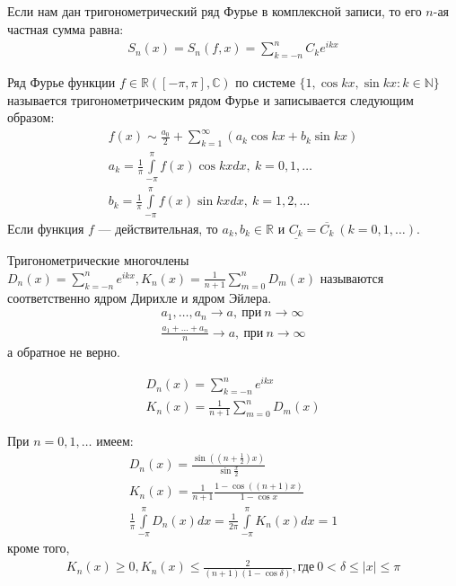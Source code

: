 \begin{definition}
  Если нам дан тригонометрический ряд Фурье в комплексной записи, то его
  $n$-ая частная сумма равна:
  \begin{gather}
    S_n(x) = S_n(f, x) = \sum\limits_{k = -n}^{n} C_k e^{ikx}
    \label{def441:eq1}
  \end{gather}
\end{definition}

\begin{definition}
  Ряд Фурье функции $f \in \mathbb{R}([-\pi, \pi], \mathbb{C})$ по системе
  $\{1, \cos kx, \sin kx: k \in \mathbb{N}\}$ называется тригонометрическим
  рядом Фурье и записывается следующим образом:
  \begin{gather}
    f(x) \sim \frac{a_0}{2} + \sum\limits_{k = 1}^{\infty} (a_k \cos kx + b_k
    \sin kx)
    \label{def442:sim1} \\
    a_k = \frac{1}{\pi} \int\limits_{-\pi}^\pi f(x) \cos kx dx, \ k = 0, 1,
    \dots
    \label{def442:coef1} \\
    b_k = \frac{1}{\pi} \int\limits_{-\pi}^\pi f(x) \sin kx dx, \ k = 1, 2,
    \dots
    \label{def442:coef2}
  \end{gather}
  Если функция $f$ --- действительная, то $a_k, b_k \in \mathbb{R}$ и
  $\underline{C_k} = \overline{C_k} \ (k = 0, 1, \dots)$.
\end{definition}

\begin{definition}
  Тригонометрические многочлены $D_n(x) = \sum\limits_{k = -n}^{n} e^{ikx},
  K_n(x) = \frac{1}{n + 1} \sum\limits_{m = 0}^{n} D_m(x)$ называются
  соответственно ядром Дирихле и ядром Эйлера.
  \begin{gather*}
    a_1, \dots, a_n \to a, \ \text{при} \ n \to \infty \\
    \frac{a_1 + \dots + a_n}{n} \to a, \ \text{при} \ n \to \infty
  \end{gather*}
  а обратное не верно.
\end{definition}

\begin{gather}
  D_n(x) = \sum\limits_{k = -n}^{n} e^{ikx}
  \label{ch44:kernels} \\
  K_n(x) = \frac{1}{n + 1} \sum\limits_{m = 0}^{n} D_m(x)
\end{gather}

\begin{theorem}
  При $n = 0, 1, \dots$ имеем:
  \begin{gather}
    D_n(x) = \frac{\sin((n + \frac{1}{2})x)}{\sin \frac{x}{2}}
    \label{th441:eq1} \\
    K_n(x) = \frac{1}{n + 1} \frac{1 - \cos ((n + 1)x)}{1 - \cos x}
    \label{th441:eq2} \\
    \frac{1}{\pi} \int\limits_{-\pi}^\pi D_n(x) dx = \frac{1}{2\pi}
    \int\limits_{-\pi}^\pi K_n(x) dx = 1
    \label{th441:eq3}
  \end{gather}
  кроме того,
  \begin{gather}
    K_n(x) \geq 0, K_n(x) \leq \frac{2}{(n+1)(1 - \cos \delta)},
    \text{где} \ 0 < \delta \leq |x| \leq \pi
    \label{th441:uneq1}
  \end{gather}
\end{theorem}

